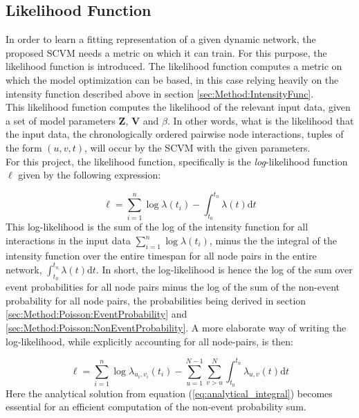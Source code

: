 \subsection{Likelihood Function}
\label{sec:Method:LikelihoodFunc}
In order to learn a fitting representation of a given dynamic network, the proposed SCVM needs a metric on which it can train.
For this purpose, the likelihood function is introduced.
The likelihood function computes a metric on which the model optimization can be based, in this case relying heavily on the intensity function described above in section \ref{sec:Method:IntensityFunc}.
\\
This likelihood function computes the likelihood of the relevant input data, given a set of model parameters $\textbf{Z}$, $\textbf{V}$ and $\beta$.
In other words, what is the likelihood that the input data, the chronologically ordered pairwise node interactions, tuples of the form $(u, v, t)$, will occur by the SCVM with the  given parameters.
\\
For this project, the likelihood function, specifically is the \textit{log}-likelihood function $\ell$ given by the following expression:

\begin{equation}
    \ell = \sum_{i=1}^n \log \lambda (t_i) - \int_{t_0}^{t_n} \lambda(t) \mathrm{d} t
    \label{eq:LogLikelihoodFunc}
\end{equation}
This log-likelihood is the sum of the log of the intensity function for all interactions in the input data $\sum_{i=1}^n \log \lambda (t_i)$, minus the the integral of the intensity function over the entire timespan for all node pairs in the entire network, $\int_{t_0}^{t_n} \lambda(t) \mathrm{d} t$. 
In short, the log-likelihood is hence the log of the sum over event probabilities for all node pairs minus the log of the sum of the non-event probability for all node pairs, the probabilities being derived in section \ref{sec:Method:Poisson:EventProbability} and \ref{sec:Method:Poisson:NonEventProbability}.
A more elaborate way of writing the log-likelihood, while explicitly accounting for all node-pairs, is then:

\begin{equation}
    \ell = \sum_{i=1}^n \log \lambda_{u_i,v_i} (t_i) - \sum_{u=1}^{N-1} \sum_{v > u}^{N} \int_{t_0}^{t_n} \lambda_{u,v}(t) \mathrm{d} t
    \label{eq:LogLikelihoodFuncExplicit}
\end{equation}
Here the analytical solution from equation (\ref{eq:analytical_integral}) becomes essential for an efficient computation of the non-event probability sum.




